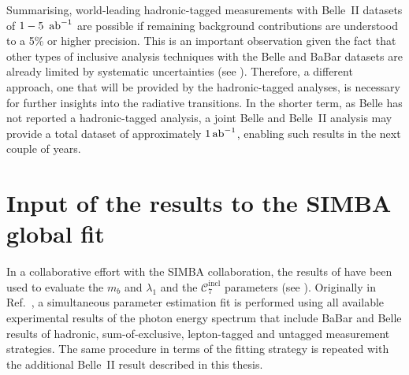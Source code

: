Summarising, world-leading hadronic-tagged \BtoXsgamma measurements with Belle~II datasets of $1-5~\mbox{\,ab}^{-1}$ are possible if remaining background contributions are understood to a 5\% or higher precision.
This is an important observation given the fact that other types of inclusive \BtoXsgamma analysis techniques with the Belle and BaBar datasets are already limited by systematic uncertainties (see ).
Therefore, a different approach, one that will be provided by the hadronic-tagged analyses, is necessary for further insights into the radiative \BtoXsgamma transitions.
In the shorter term, as Belle has not reported a hadronic-tagged \BtoXsgamma analysis, a joint Belle and Belle~II analysis may provide a total dataset of approximately $1\mbox{\,ab}^{-1}$, enabling such results in the next couple of years.

\section{Input of the results to the SIMBA global fit}\label{sec:input_to_theory}

In a collaborative effort with the SIMBA collaboration, the results of 
have been used to evaluate the $m_b$ and $\lambda_1$ and the $\mathcal{C}_7^{\mathrm{incl}}$ parameters (see ). 
Originally in Ref.~\cite{Bernlochner:2020jlt}, a simultaneous parameter estimation fit is performed using all available experimental results of the photon energy spectrum that include
BaBar and Belle results of hadronic, sum-of-exclusive, lepton-tagged and untagged measurement strategies.
The same procedure in terms of the fitting strategy is repeated with the additional Belle~II result described in this thesis.

